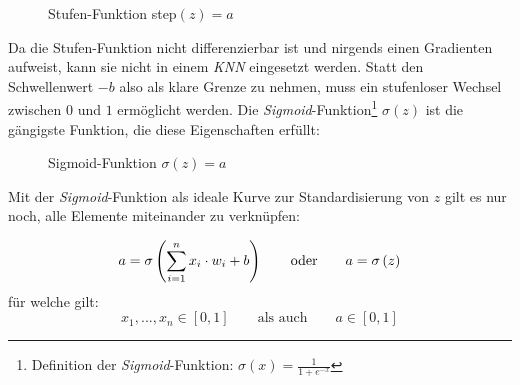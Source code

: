 \begin{figure}[h]
	\centering
	\caption[Stufen-Funktion]{Stufen-Funktion step$(z) = a$}
	\label{plt:step}
\end{figure}
Da die Stufen-Funktion nicht differenzierbar ist und nirgends einen Gradienten aufweist, kann sie nicht in einem \textit{KNN} eingesetzt werden. Statt den Schwellenwert $-b$ also als klare Grenze zu nehmen, muss ein stufenloser Wechsel zwischen $0$ und $1$ ermöglicht werden. Die \textit{Sigmoid}-Funktion\footnote{Definition der \textit{Sigmoid}-Funktion: $\sigma(x) = \frac{1}{1+e^{-x}}$} $\sigma(z)$ ist die gängigste Funktion, die diese Eigenschaften erfüllt: 


\begin{figure}[h]
	\centering
	\caption[Sigmoid-Funktion]{Sigmoid-Funktion $\sigma(z) = a$}
	\label{plt:sigmoid}
\end{figure}
Mit der \textit{Sigmoid}-Funktion als ideale Kurve zur Standardisierung von $z$ gilt es nur noch, alle Elemente miteinander zu verknüpfen:


\begin{equation}\label{eq:neuron_eq}
a = \sigma \left( \sum_{i=1}^{n} x_i\cdot w_i+b\right)  \qquad \text{oder} \qquad a = \sigma \left( z \right)
\vspace*{2mm}
\end{equation}
für welche gilt:
\[x_1,...,x_n \in \left[0, 1\right] \qquad \text{als auch} \qquad a\in \left[0, 1\right] \]

